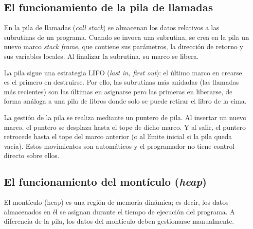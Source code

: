 \documentclass[12pt, a4paper, twoside]{article}
\begin{document}
\subsection{El funcionamiento de la pila de llamadas}
En la pila de llamadas (\textit{call stack}) se almacenan los datos relativos a las subrutinas de un programa. Cuando se invoca una subrutina, se crea en la pila un nuevo marco \textit{stack frame}, que contiene sus parámetros, la dirección de retorno y sus variables locales. Al finalizar la subrutina, su marco se libera.

La pila sigue una estrategia LIFO (\textit{last in, first out}): el último marco en crearse es el primero en destruirse. Por ello, las subrutinas más anidadas (las llamadas más recientes) son las últimas en asignarse pero las primeras en liberarse, de forma análoga a una pila de libros donde solo se puede retirar el libro de la cima.


La gestión de la pila se realiza mediante un puntero de pila. Al insertar un nuevo marco, el puntero se desplaza hasta el tope de dicho marco. Y al salir, el puntero retrocede hasta el tope del marco anterior (o al límite inicial si la pila queda vacía). Estos movimientos son automáticos y el programador no tiene control directo sobre ellos.



\subsection{El funcionamiento del montículo (\textit{heap})}
El montículo (heap) es una región de memoria dinámica; es decir, los datos almacenados en él se asignan durante el tiempo de ejecución del programa. A diferencia de la pila, los datos del montículo deben gestionarse manualmente. 
\end{document}
